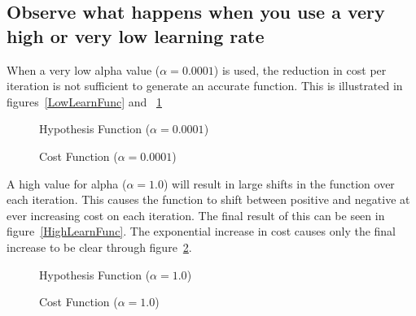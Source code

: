 \documentclass[titlepage]{scrartcl}
\begin{document}
\subsection{Observe what happens when you use a very high or very low learning
rate}
When a very low alpha value ($\alpha=0.0001$) is used, the reduction in cost per
iteration is not sufficient to generate an accurate function. This is
illustrated in figures~\ref{LowLearnFunc} and ~\ref{LowLearnCost}

\begin{figure}[H]
    \caption{Hypothesis Function ($\alpha=0.0001$)}
    \label{LowLearnFunc}
    \caption{Cost Function ($\alpha=0.0001$)}
    \label{LowLearnCost}
\end{figure}

A high value for alpha ($\alpha=1.0$) will result in large shifts in the
function over each iteration. This causes the function to shift between
positive and negative at ever increasing cost on each iteration. The final
result of this can be seen in figure~\ref{HighLearnFunc}. The exponential
increase in cost causes only the final increase to be clear through
figure~\ref{HighLearnCost}.

\begin{figure}[H]
    \caption{Hypothesis Function ($\alpha=1.0$)}
    \label{HighLearnFunc}
    \caption{Cost Function ($\alpha=1.0$)}
    \label{HighLearnCost}
\end{figure}

\end{document}
